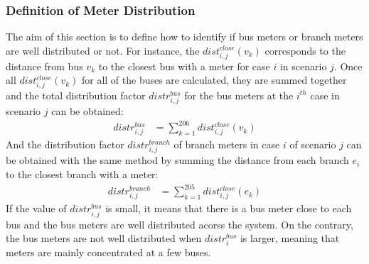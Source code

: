 \subsubsection{Definition of Meter Distribution}
The aim of this section is to define how to identify if bus meters or branch meters are well distributed or not. For instance, the $dist_{i,j}^{close}{ ( v_k ) }$ corresponds to the distance from bus $v_k$ to the closest bus with a meter for case $i$ in scenario $j$. Once all $dist_{i,j}^{close}{ ( v_k ) }$ for all of the buses are calculated, they are summed together and the total distribution factor $distr^{bus}_{i,j}$ for the bus meters at the $i^{th}$ case in scenario $j$ can be obtained:
\begin{align}
    distr^{bus}_{i,j} &= \sum_{k=1}^{206} dist_{i,j}^{close}{(v_k)}
    \label{eq:distr_bus}
\end{align}
And the distribution factor $distr^{branch}_{i,j}$ of branch meters in case $i$ of scenario $j$ can be obtained with the same method by summing the distance from each branch $e_i$ to the closest branch with a meter:
\begin{align}
    distr^{branch}_{i,j} &= \sum_{k=1}^{205} dist_{i,j}^{close}{(e_k)}
    \label{eq:distr_branch}
\end{align}
If the value of $distr^{bus}_{i,j}$ is small, it means that there is a bus meter close to each bus and the bus meters are well distributed acorss the system. On the contrary, the bus meters are not well distributed when $distr^{bus}_i$ is larger, meaning that meters are mainly concentrated at a few buses.

